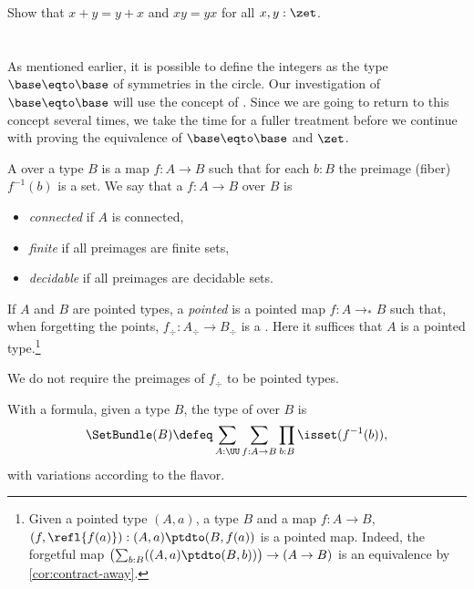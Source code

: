 \begin{xca}\label{xca:commutative-add-Z}
  Show that $x+y = y+x$ and $xy=yx$ for all $x,y:\zet$.
\end{xca}

\section{\Coverings}
\label{sec:covering}

As mentioned earlier, it is possible to define the integers as the
type $\base\eqto\base$ of symmetries in the circle.
Our investigation of $\base\eqto\base$ will use the concept of \coverings.
Since we are going to return to this concept several times,
we take the time for a fuller treatment before we continue with
proving the equivalence of $\base\eqto\base$ and $\zet$.

\begin{definition}\label{def:covering}
A \emph{\covering} over a type $B$
is a map $f:A\to B$ such that for each $b:B$ the preimage 
(fiber) $f^{-1}(b)$ is a set.
We say that a \covering $f:A\to B$ over $B$ is
\begin{itemize}
\item \emph{connected} if $A$ is connected,
\item \emph{finite} if all preimages are finite sets,
\item \emph{decidable} if all preimages are decidable sets.
\end{itemize}

If $A$ and $B$ are pointed types, a \emph{pointed} \covering is a pointed map
$f:A\to_*B$ such that, when forgetting the points, $f_\div:A_\div\to B_\div$
is a \covering. Here it suffices that $A$ is a pointed type.\footnote{%
  Given a pointed type $(A,a)$, a type $B$ and a map $f : A \to B$,
  $(f,\refl{f(a)}) : (A,a) \ptdto (B,f(a))$ is a pointed map.
  Indeed, the forgetful map $\bigl(\sum_{b:B}((A,a)\ptdto(B,b))\bigr)
  \to (A \to B)$ is an equivalence by \cref{cor:contract-away}.}

We do not require the preimages of $f_\div$ to be pointed types.
\end{definition}
With a formula, given a type $B$, the type of \coverings over $B$ is
\[
\SetBundle(B) \defeq \sum_{A:\UU}\sum_{f:A\to B}\prod_{b:B}\isset(f^{-1}(b)),
\]
with variations according to the flavor.

